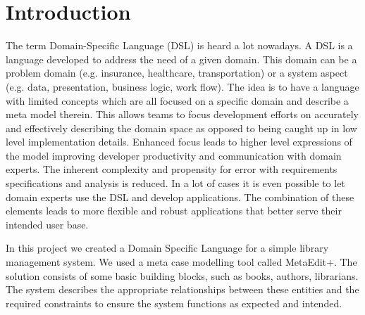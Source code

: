 \section{Introduction}
The term Domain-Specific Language (DSL) is heard a lot nowadays. A DSL is a language developed to address the need of a given domain. This domain can be a problem domain (e.g. insurance, healthcare, transportation) or a system aspect (e.g. data, presentation, business logic, work flow).
The idea is to have a language with limited concepts which are all focused on a specific domain and describe a meta model therein. 
This allows teams to focus development efforts on accurately and effectively describing the domain space as opposed to being caught up in low level implementation details.
Enhanced focus leads to higher level expressions of the model improving developer productivity and communication with domain experts. The inherent complexity and propensity for error with requirements specifications and analysis is reduced.
In a lot of cases it is even possible to let domain experts use the DSL and develop applications. The combination of these elements leads to more flexible and robust applications that better serve their intended user base.

In this project we created a Domain Specific Language for a simple library management system. We used a meta case modelling tool called MetaEdit+.  The solution consists of some basic building blocks, such as books, authors, librarians. The system describes the appropriate relationships between these entities and the required constraints to ensure the system functions as expected and intended.